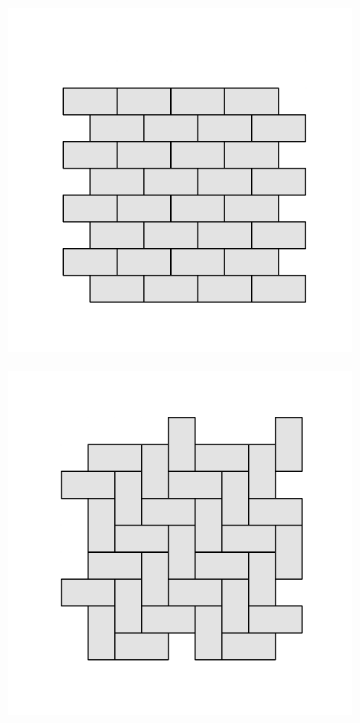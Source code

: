 \begin{figure}[bt]
     \centering
     
      \begin{subfigure}[b]{0.16\textwidth}
         \centering
         \includegraphics[width=\textwidth]{./figures/procrystals/t8.pdf}
         \caption{}
         \label{fig:pro3pksq1}
     \end{subfigure}
     \hfill
      \begin{subfigure}[b]{0.16\textwidth}
         \centering
         \includegraphics[width=\textwidth]{./figures/procrystals/t7.pdf}

\end{subfigure}
\end{figure}
